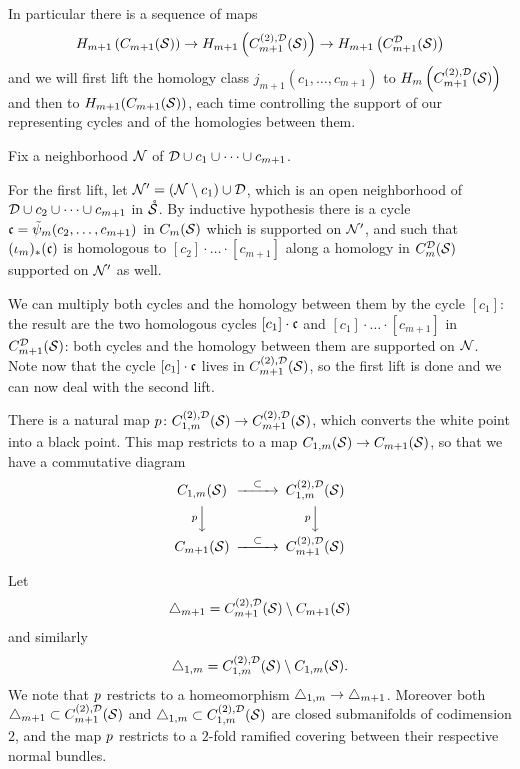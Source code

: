 In particular there is a sequence of maps
\[
 H_{m+1}\pa{C_{m+1}(\S)}\to H_{m+1}\pa{\cmstwoD}\to H_{m+1}\pa{C_{m+1}^{\D}(\S)}
\]
and we will first lift the homology class $j_{m+1}(c_1,\dots,c_{m+1})$ to $H_m\pa{\cmstwoD}$ and
then to $H_{m+1}(C_{m+1}(\S))$, each time controlling the support of our representing
cycles and of the homologies between them.

Fix a neighborhood $\N$ of $\D\cup c_1\cup\dots\cup c_{m+1}$.

For the first lift, let $\N'=\pa{\N\setminus c_1}\cup\D$, which is an open
neighborhood of $\D\cup c_2\cup\dots\cup c_{m+1}$ in $\mrS$. By inductive hypothesis
there is a cycle $\fc=\tpsi_m(c_2,\dots,c_{m+1})$ in $\cms$ which is supported on $\N'$,
and such that $(\iota_m)_*(\fc)$ is homologous to $[c_2]\cdot\ldots\cdot[c_{m+1}]$
along a homology in $\cmsD$ supported on $\N'$ as well.

We can multiply both
cycles and the homology between them by the cycle $[c_1]$: the result are the two homologous cycles
$[c_1]\cdot \fc$ and $[c_1]\cdot\ldots\cdot[c_{m+1}]$ in $C_{m+1}^{\D}(\S)$: both cycles and the
homology between them are supported on $\N$. Note now that the
cycle $[c_1]\cdot\fc$ lives in $\cmstwoD$, so the first lift is done and we can now
deal with the second lift.

There is a natural map $\p\colon \fmstwoD\to \cmstwoD$, which converts the white point
into a black point. This map restricts to %
a map $C_{1,m}(\S)\to C_{m+1}(\S)$, so that
we have a commutative diagram
 \begin{equation}\label{eq:cmstwodiagram}
  \begin{CD}
   C_{1,m}(\S) @>\subset >> \fmstwoD %
\\   @V\p VV @V\p VV %
\\   C_{m+1}(\S) @>\subset >> \cmstwoD %
   \end{CD}
\end{equation}

\begin{defn}
\label{defn:falsediagonals} 
Let 
\[
\Dmone=\cmstwoD\setminus C_{m+1}(\S)
\]
and similarly
\[
\Donem=\fmstwoD\setminus C_{1,m}(\S).
\]
We note that $\p$ restricts to a homeomorphism $\Donem\to\Dmone$. Moreover both $\Dmone\subset\cmstwoD$
and $\Donem\subset\fmstwoD$ are closed submanifolds of codimension $2$, and the map $\p$ restricts to
a $2$-fold ramified covering between their respective normal bundles.
\end{defn}

